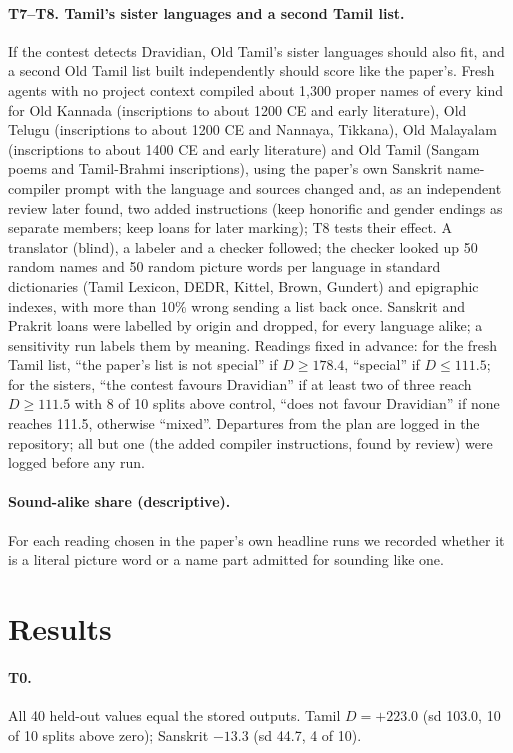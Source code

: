 \documentclass[11pt,a4paper]{article}
\begin{document}
\paragraph{T7--T8. Tamil's sister languages and a second Tamil list.} If the contest detects Dravidian, Old Tamil's sister languages should also fit, and a second Old Tamil list built independently should score like the paper's. Fresh agents with no project context compiled about 1,300 proper names of every kind for Old Kannada (inscriptions to about 1200 CE and early literature), Old Telugu (inscriptions to about 1200 CE and Nannaya, Tikkana), Old Malayalam (inscriptions to about 1400 CE and early literature) and Old Tamil (Sangam poems and Tamil-Brahmi inscriptions), using the paper's own Sanskrit name-compiler prompt with the language and sources changed and, as an independent review later found, two added instructions (keep honorific and gender endings as separate members; keep loans for later marking); T8 tests their effect. A translator (blind), a labeler and a checker followed; the checker looked up 50 random names and 50 random picture words per language in standard dictionaries (Tamil Lexicon, DEDR, Kittel, Brown, Gundert) and epigraphic indexes, with more than 10\% wrong sending a list back once. Sanskrit and Prakrit loans were labelled by origin and dropped, for every language alike; a sensitivity run labels them by meaning. Readings fixed in advance: for the fresh Tamil list, ``the paper's list is not special'' if $D\ge178.4$, ``special'' if $D\le111.5$; for the sisters, ``the contest favours Dravidian'' if at least two of three reach $D\ge111.5$ with 8 of 10 splits above control, ``does not favour Dravidian'' if none reaches 111.5, otherwise ``mixed''. Departures from the plan are logged in the repository; all but one (the added compiler instructions, found by review) were logged before any run.

\paragraph{Sound-alike share (descriptive).} For each reading chosen in the paper's own headline runs we recorded whether it is a literal picture word or a name part admitted for sounding like one.

\section{Results}\label{sec:results}

\paragraph{T0.} All 40 held-out values equal the stored outputs. Tamil $D=+223.0$ (sd 103.0, 10 of 10 splits above zero); Sanskrit $-13.3$ (sd 44.7, 4 of 10).
\end{document}
